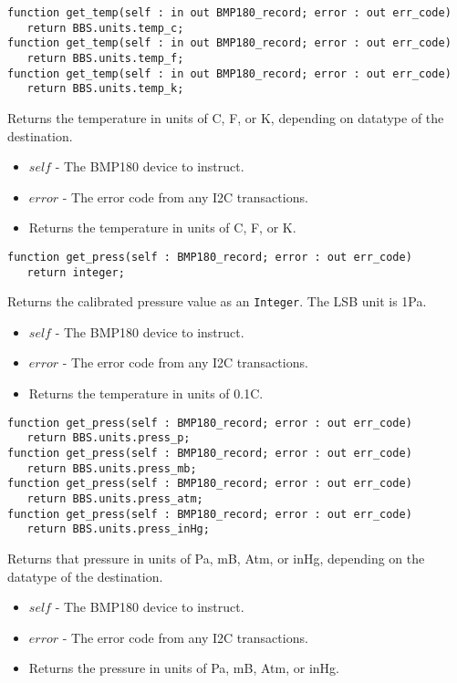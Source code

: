 \documentclass[10pt, openany]{book}
\newcommand{\indexfunc}[1]{\index[func]{#1}}
\newcommand{\datatype}[1]{\texttt{#1}}
\begin{document}
\begin{lstlisting}
function get_temp(self : in out BMP180_record; error : out err_code)
   return BBS.units.temp_c;
function get_temp(self : in out BMP180_record; error : out err_code)
   return BBS.units.temp_f;
function get_temp(self : in out BMP180_record; error : out err_code)
   return BBS.units.temp_k;
\end{lstlisting}
\indexfunc{get\_temp}
Returns the temperature in units of \degree{}C, \degree{}F, or K, depending on datatype of the destination.
\begin{itemize}
  \item $self$ - The BMP180 device to instruct.  \item $error$ - The error code from any I2C transactions.

  \item Returns the temperature in units of \degree{}C, \degree{}F, or K.
\end{itemize}

\begin{lstlisting}
function get_press(self : BMP180_record; error : out err_code)
   return integer;
\end{lstlisting}
\indexfunc{get\_press}
Returns the calibrated pressure value as an \datatype{Integer}.  The LSB unit is 1Pa.
\begin{itemize}
  \item $self$ - The BMP180 device to instruct.
  \item $error$ - The error code from any I2C transactions.
  \item Returns the temperature in units of 0.1\degree{}C.
\end{itemize}

\begin{lstlisting}
function get_press(self : BMP180_record; error : out err_code)
   return BBS.units.press_p;
function get_press(self : BMP180_record; error : out err_code)
   return BBS.units.press_mb;
function get_press(self : BMP180_record; error : out err_code)
   return BBS.units.press_atm;
function get_press(self : BMP180_record; error : out err_code)
   return BBS.units.press_inHg;
\end{lstlisting}
\indexfunc{get\_press}
Returns that pressure in units of Pa, mB, Atm, or inHg, depending on the datatype of the destination.
\begin{itemize}
  \item $self$ - The BMP180 device to instruct.
  \item $error$ - The error code from any I2C transactions.
  \item Returns the pressure in units of Pa, mB, Atm, or inHg.
\end{itemize}
\end{document}
